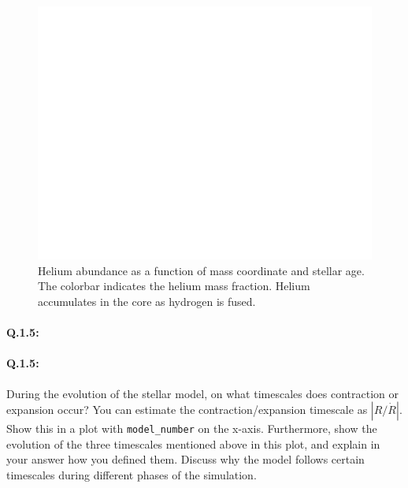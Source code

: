 \documentclass[twocolumn,fontsize=11pt]{scrartcl}
\begin{document}
\begin{figure}[htbp]
    \centering
    \includegraphics{q14_abundancy_e.pdf}
    \caption{Helium abundance as a function of mass coordinate and stellar age. The colorbar indicates the helium mass fraction. Helium accumulates in the core as hydrogen is fused.}
    \label{fig:q14_abundancy_e}
\end{figure}


\paragraph{Q.1.5:} 

\paragraph{Q.1.5:} During the evolution of the stellar model, on what timescales does contraction or expansion occur? You can estimate the contraction/expansion timescale as \(\left|R/\dot{R}\right|\). Show this in a plot with \texttt{model\_number} on the x-axis. Furthermore, show the evolution of the three timescales mentioned above in this plot, and explain in your answer how you defined them. Discuss why the model follows certain timescales during different phases of the simulation.
\end{document}
